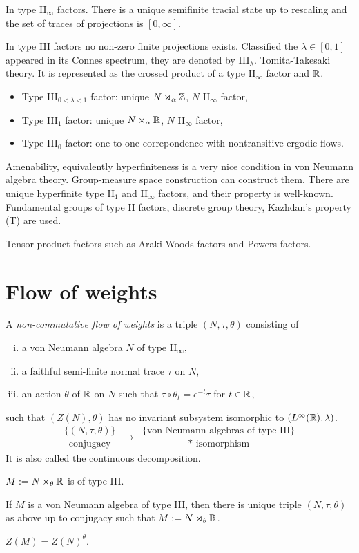 \documentclass{../../large}
\begin{document}
In type II$_\infty$ factors.
There is a unique semifinite tracial state up to rescaling and the set of traces of projections is $[0,\infty]$.

In type III factors no non-zero finite projections exists.
Classified the $\lambda\in[0,1]$ appeared in its Connes spectrum, they are denoted by III$_\lambda$.
Tomita-Takesaki theory.
It is represented as the crossed product of a type II$_\infty$ factor and $\mathbb{R}$.

\begin{itemize}
\item Type III$_{0<\lambda<1}$ factor: unique $N\rtimes_\alpha\mathbb{Z}$, $N$ II$_\infty$ factor,
\item Type III$_1$ factor: unique $N\rtimes_\alpha\mathbb{R}$, $N$ II$_\infty$ factor,
\item Type III$_0$ factor: one-to-one correpondence with nontransitive ergodic flows.
\end{itemize}

Amenability, equivalently hyperfiniteness is a very nice condition in von Neumann algebra theory.
Group-measure space construction can construct them.
There are unique hyperfinite type II$_1$ and II$_\infty$ factors, and their property is well-known.
Fundamental groups of type II factors, discrete group theory, Kazhdan's property (T) are used.

Tensor product factors such as Araki-Woods factors and Powers factors.



\section{Flow of weights}

\begin{prb}
A \emph{non-commutative flow of weights} is a triple $(N,\tau,\theta)$ consisting of
\begin{enumerate}[(i)]
\item a von Neumann algebra $N$ of type II$_\infty$,
\item a faithful semi-finite normal trace $\tau$ on $N$,
\item an action $\theta$ of $\mathbb{R}$ on $N$ such that $\tau\circ\theta_t=e^{-t}\tau$ for $t\in\mathbb{R}$,
\end{enumerate}
such that $(Z(N),\theta)$ has no invariant subsystem isomorphic to $(L^\infty(\mathbb{R}),\lambda)$.
\[\begin{array}{ccc}
\dfrac{\{(N,\tau,\theta)\}}{\text{conjugacy}}&\to&\dfrac{\{\text{von Neumann algebras of type III}\}}{\text{$*$-isomorphism}}
\end{array}\]
It is also called the continuous decomposition.
\begin{parts}
\item $M:=N\rtimes_\theta\mathbb{R}$ is of type III.
\item If $M$ is a von Neumann algebra of type III, then there is unique triple $(N,\tau,\theta)$ as above up to conjugacy such that $M:=N\rtimes_\theta\mathbb{R}$.
\item $Z(M)=Z(N)^\theta$.
\end{parts}
\end{prb}
\end{document}

